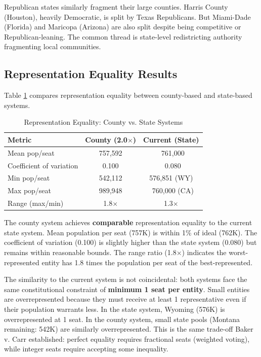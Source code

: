 Republican states similarly fragment their large counties. Harris County (Houston), heavily Democratic, is split by Texas Republicans. But Miami-Dade (Florida) and Maricopa (Arizona) are also split despite being competitive or Republican-leaning. The common thread is state-level redistricting authority fragmenting local communities.

\subsection{Representation Equality Results}

Table \ref{tab:equality} compares representation equality between county-based and state-based systems.

\begin{table}[h]
\centering
\caption{Representation Equality: County vs. State Systems}
\label{tab:equality}
\begin{tabular}{lcc}
\toprule
Metric & County (2.0$\times$) & Current (State) \\
\midrule
Mean pop/seat & 757,592 & ~761,000 \\
Coefficient of variation & 0.100 & ~0.080 \\
Min pop/seat & 542,112 & 576,851 (WY) \\
Max pop/seat & 989,948 & ~760,000 (CA) \\
Range (max/min) & 1.8$\times$ & 1.3$\times$ \\
\bottomrule
\end{tabular}
\end{table}

The county system achieves \textbf{comparable} representation equality to the current state system. Mean population per seat (757K) is within 1\% of ideal (762K). The coefficient of variation (0.100) is slightly higher than the state system (0.080) but remains within reasonable bounds. The range ratio (1.8$\times$) indicates the worst-represented entity has 1.8 times the population per seat of the best-represented.

The similarity to the current system is not coincidental: both systems face the same constitutional constraint of \textbf{minimum 1 seat per entity}. Small entities are overrepresented because they must receive at least 1 representative even if their population warrants less. In the state system, Wyoming (576K) is overrepresented at 1 seat. In the county system, small state pools (Montana remaining: 542K) are similarly overrepresented. This is the same trade-off Baker v. Carr established: perfect equality requires fractional seats (weighted voting), while integer seats require accepting some inequality.

